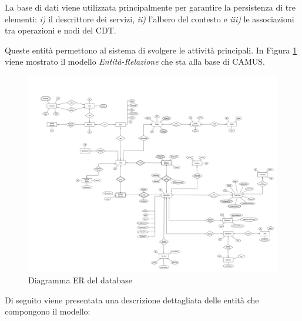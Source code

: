 La base di dati viene utilizzata principalmente per garantire la persistenza di tre elementi: \emph{i)} il descrittore dei servizi, \emph{ii)} l'albero del contesto e \emph{iii)} le associazioni tra operazioni e nodi del CDT.

Queste entità permettono al sistema di svolgere le attività principali. In Figura \ref{fig:schema-er-db} viene mostrato il modello \emph{Entità-Relazione} che sta alla base di CAMUS.

\begin{figure}[ht]
	\centering
	\includegraphics[width=\textwidth]{5-implementazione-backend/Immagini/schema_er_db.png}
	\caption{Diagramma ER del database}\label{fig:schema-er-db}
\end{figure}

Di seguito viene presentata una descrizione dettagliata delle entità che compongono il modello:

